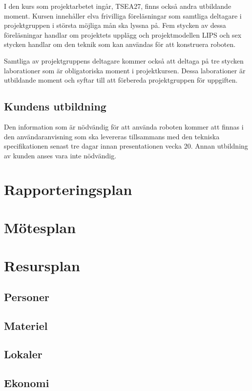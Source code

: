 \documentclass[a4paper,12pt]{article}
\begin{document}
I den kurs som projektarbetet ingår, TSEA27, finns också andra utbildande moment. Kursen innehåller elva frivilliga föreläsningar som samtliga deltagare i projektgruppen i största möjliga mån ska lyssna på. Fem stycken av dessa föreläsningar handlar om projektets upplägg och projektmodellen LIPS och sex stycken handlar om den teknik som kan användas för att konstruera roboten.

Samtliga av projektgruppens deltagare kommer också att deltaga på tre stycken laborationer som är obligatoriska moment i projektkursen. Dessa laborationer är utbildande moment och syftar till att förbereda projektgruppen för uppgiften.


\subsection{Kundens utbildning}
Den information som är nödvändig för att använda roboten kommer att finnas i den användaranvisning som ska levereras tillsammans med den tekniska specifikationen senast tre dagar innan presentationen vecka 20. Annan utbildning av kunden anses vara inte nödvändig.


\section{Rapporteringsplan}

\section{Mötesplan}

\section{Resursplan}	%
\subsection{Personer}
\subsection{Materiel}
\subsection{Lokaler}
\subsection{Ekonomi}
\end{document}
